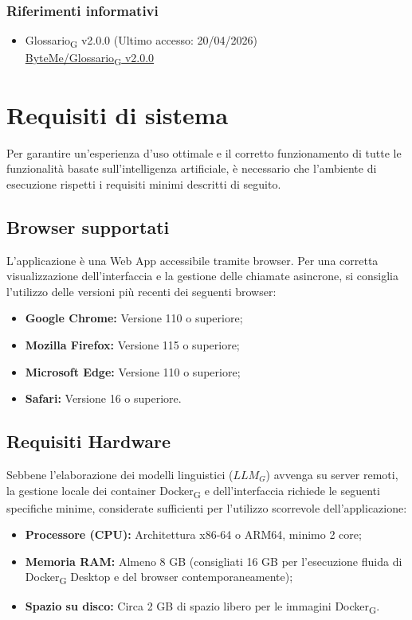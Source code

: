 \documentclass[11pt,a4paper]{article}
\newcommand{\gls}[1]{#1\textsubscript{G}}
\begin{document}
\subsubsection{Riferimenti informativi}
\begin{itemize}
    \item \gls{Glossario} v2.0.0 (Ultimo accesso: 20/04/2026)\\
    \href{https://byteme25.github.io/ByteMe/files.html}{ByteMe/\gls{Glossario} v2.0.0}
\end{itemize}

\newpage

\section{Requisiti di sistema}
Per garantire un'esperienza d'uso ottimale e il corretto funzionamento di tutte le funzionalità basate sull'intelligenza artificiale, è necessario che l'ambiente di esecuzione rispetti i requisiti minimi descritti di seguito.

\subsection{Browser supportati}
L'applicazione è una Web App accessibile tramite browser. Per una corretta visualizzazione dell'interfaccia e la gestione delle chiamate asincrone, si consiglia l'utilizzo delle versioni più recenti dei seguenti browser:
\begin{itemize}
    \item \textbf{Google Chrome:} Versione 110 o superiore;
    \item \textbf{Mozilla Firefox:} Versione 115 o superiore;
    \item \textbf{Microsoft Edge:} Versione 110 o superiore;
    \item \textbf{Safari:} Versione 16 o superiore.
\end{itemize}

\subsection{Requisiti Hardware}
Sebbene l'elaborazione dei modelli linguistici ($LLM_G$) avvenga su server remoti, la gestione locale dei container \gls{Docker} e dell'interfaccia richiede le seguenti specifiche minime, considerate sufficienti per l'utilizzo scorrevole dell'applicazione:
\begin{itemize}
    \item \textbf{Processore (CPU):} Architettura x86-64 o ARM64, minimo 2 core;
    \item \textbf{Memoria RAM:} Almeno 8 GB (consigliati 16 GB per l'esecuzione fluida di \gls{Docker} Desktop e del browser contemporaneamente);
    \item \textbf{Spazio su disco:} Circa 2 GB di spazio libero per le immagini \gls{Docker}.
\end{itemize}
\end{document}
